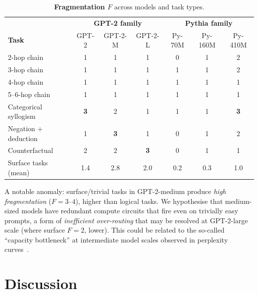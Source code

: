 \documentclass{article}
\begin{document}
\begin{table}[h]
\centering
\caption{\textbf{Fragmentation $F$} across models and task types.}
\label{tab:fragmentation}
\small
\begin{tabular}{lccc|ccc}
\toprule
 & \multicolumn{3}{c|}{\textbf{GPT-2 family}} & \multicolumn{3}{c}{\textbf{Pythia family}} \\
\textbf{Task} & GPT-2 & GPT-2-M & GPT-2-L & Py-70M & Py-160M & Py-410M \\
\midrule
2-hop chain         & 1 & 1 & 1 & 0 & 1 & 2 \\
3-hop chain         & 1 & 1 & 1 & 1 & 1 & 2 \\
4-hop chain         & 1 & 1 & 1 & 1 & 1 & 1 \\
5--6-hop chain      & 1 & 1 & 1 & 1 & 1 & 1 \\
\midrule
Categorical syllogism & \textbf{3} & 2 & 1 & 1 & 1 & \textbf{3} \\
Negation + deduction  & 1 & \textbf{3} & 1 & 0 & 1 & 2 \\
Counterfactual        & 2 & 2 & \textbf{3} & 0 & 1 & 1 \\
\midrule
Surface tasks (mean)  & 1.4 & 2.8 & 2.0 & 0.2 & 0.3 & 1.0 \\
\bottomrule
\end{tabular}
\end{table}

A notable anomaly: surface/trivial tasks in GPT-2-medium produce
\emph{high fragmentation} ($F = 3$--$4$), higher than logical tasks.
We hypothesise that medium-sized models have redundant compute circuits
that fire even on trivially easy prompts, a form of \emph{inefficient
over-routing} that may be resolved at GPT-2-large scale (where surface
$F = 2$, lower).
This could be related to the so-called ``capacity bottleneck'' at
intermediate model scales observed in perplexity
curves~\citep{kaplan2020scaling}.


\section{Discussion}
\end{document}
